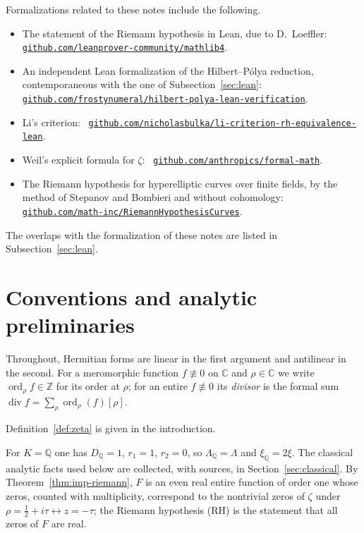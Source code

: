 \documentclass[11pt]{amsart}
\theoremstyle{plain}
\theoremstyle{definition}
\theoremstyle{remark}
\numberwithin{equation}{section}
\newcommand{\ghlink}[2]{\cite{#1}\,%
  \href{https://github.com/#2}{\nolinkurl{github.com/#2}}}
\newcommand{\C}{\mathbb{C}}
\newcommand{\Q}{\mathbb{Q}}
\newcommand{\Z}{\mathbb{Z}}
\DeclareMathOperator{\divisor}{div}
\DeclareMathOperator{\ord}{ord}
\begin{document}
\begin{sloppypar}
Formalizations related to these notes include the following.
\begin{itemize}
\item The statement of the Riemann hypothesis in Lean, due to
  D.~Loeffler: \ghlink{Mathlib2026RiemannHypothesis}%
  {leanprover-community/mathlib4}.
\item An independent Lean formalization of the Hilbert--P\'olya
  reduction, contemporaneous with the one of Subsection~\ref{sec:lean}:
  \ghlink{Csillag2026HilbertPolyaLean}%
  {frostynumeral/hilbert-polya-lean-verification}.
\item Li's criterion: \ghlink{Bulka2026LiCriterionLean}%
  {nicholasbulka/li-criterion-rh-equivalence-lean}.
\item Weil's explicit formula for $\zeta$:
  \ghlink{Anthropic2026Zeta23}{anthropics/formal-math}.
\item The Riemann hypothesis for hyperelliptic curves over finite
  fields, by the method of Stepanov and Bombieri and without cohomology:
  \ghlink{MathInc2026RHCurves}{math-inc/RiemannHypothesisCurves}.
\end{itemize}
\end{sloppypar}
The overlaps with the formalization of these notes are listed in
Subsection~\ref{sec:lean}.



\section{Conventions and analytic preliminaries}\label{sec:conventions}

Throughout, Hermitian forms are linear in the first argument and
antilinear in the second. For a meromorphic function $f\not\equiv0$ on
$\C$ and $\rho\in\C$ we write $\ord_\rho f\in\Z$ for its order at
$\rho$; for an entire $f\not\equiv0$ its \emph{divisor} is the formal
sum $\divisor f=\sum_\rho \ord_\rho(f)[\rho]$.

Definition~\ref{def:zeta} is given in the introduction.

For $K=\Q$ one has $D_\Q=1$, $r_1=1$, $r_2=0$, so
$\Lambda_\Q=\Lambda$ and $\xi_\Q=2\xi$. The classical analytic facts
used below are collected, with sources, in
Section~\ref{sec:classical}. By Theorem~\ref{thm:imp-riemann}, $F$ is an
even real entire function of order one whose zeros, counted with
multiplicity, correspond to the nontrivial zeros of $\zeta$ under
$\rho=\tfrac12+i\tau\leftrightarrow z=-\tau$; the Riemann
hypothesis (RH) is the statement that all zeros of $F$ are real.
\end{document}
